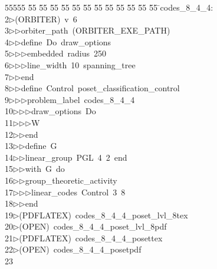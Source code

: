 %
%
\begin{tabbing}
55555 \= 55 \= 55 \= 55 \= 55 \= 55 \= 55 \= 55 \= 55 \= 55 \= 55 \= 55 \= 55 \= \>codes\_8\_4\_4:\\[0pt]
2\>$\triangleright$\>(ORBITER)\ v\ 6\ \\[0pt]
3\>$\triangleright$\>$\triangleright$\>orbiter\_path\ (ORBITER\_EXE\_PATH)\ \\[0pt]
4\>$\triangleright$\>$\triangleright$\>define\ Do\ draw\_options\ \\[0pt]
5\>$\triangleright$\>$\triangleright$\>$\triangleright$\>embedded\ radius\ 250\ \\[0pt]
6\>$\triangleright$\>$\triangleright$\>$\triangleright$\>line\_width\ 10\ spanning\_tree\ \\[0pt]
7\>$\triangleright$\>$\triangleright$\>end\ \\[0pt]
8\>$\triangleright$\>$\triangleright$\>define\ Control\ poset\_classification\_control\ \\[0pt]
9\>$\triangleright$\>$\triangleright$\>$\triangleright$\>problem\_label\ codes\_8\_4\_4\ \\[0pt]
10\>$\triangleright$\>$\triangleright$\>$\triangleright$\>draw\_options\ Do\ \\[0pt]
11\>$\triangleright$\>$\triangleright$\>$\triangleright$\>W\ \\[0pt]
12\>$\triangleright$\>$\triangleright$\>end\ \\[0pt]
13\>$\triangleright$\>$\triangleright$\>define\ G\ \\[0pt]
14\>$\triangleright$\>$\triangleright$\>linear\_group\ PGL\ 4\ 2\ end\ \\[0pt]
15\>$\triangleright$\>$\triangleright$\>with\ G\ do\ \\[0pt]
16\>$\triangleright$\>$\triangleright$\>group\_theoretic\_activity\ \\[0pt]
17\>$\triangleright$\>$\triangleright$\>$\triangleright$\>linear\_codes\ Control\ 3\ 8\ \\[0pt]
18\>$\triangleright$\>$\triangleright$\>end\\[0pt]
19\>$\triangleright$\>(PDFLATEX)\ codes\_8\_4\_4\_poset\_lvl\_8tex\\[0pt]
20\>$\triangleright$\>(OPEN)\ codes\_8\_4\_4\_poset\_lvl\_8pdf\\[0pt]
21\>$\triangleright$\>(PDFLATEX)\ codes\_8\_4\_4\_posettex\\[0pt]
22\>$\triangleright$\>(OPEN)\ codes\_8\_4\_4\_posetpdf\\[0pt]
23\>\end{tabbing}
